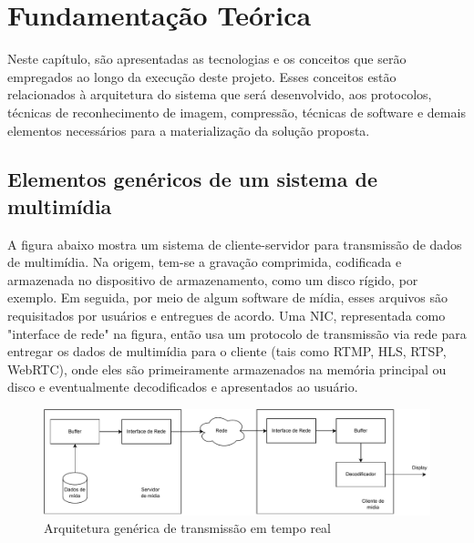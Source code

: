 \documentclass[12pt, %
openright, 
oneside, %
a4paper,    %
brazil]{facom-ufu-abntex2}
\begin{document}

\chapter{Fundamentação Teórica}

Neste capítulo, são apresentadas as tecnologias e os conceitos que serão
empregados ao longo da execução deste projeto. Esses conceitos estão
relacionados à arquitetura do sistema que será desenvolvido, aos protocolos,
técnicas de reconhecimento de imagem, compressão, técnicas de software e demais
elementos necessários para a materialização da solução proposta.

\section{Elementos genéricos de um sistema de multimídia}

A figura abaixo mostra um sistema de cliente-servidor para transmissão de dados
de multimídia. Na origem, tem-se a gravação comprimida, codificada e armazenada
no dispositivo de armazenamento, como um disco rígido, por exemplo. Em seguida,
por meio de algum software de mídia, esses arquivos são requisitados por
usuários e entregues de acordo. Uma NIC, representada como "interface de rede"
na figura, então usa um protocolo de transmissão via rede para entregar os
dados de multimídia para o cliente (tais como RTMP, HLS, RTSP, WebRTC), onde
eles são primeiramente armazenados na memória principal ou disco e
eventualmente decodificados e apresentados ao usuário.

\begin{figure}[!ht]
	\centering
	\includegraphics[width=1\linewidth]{media_fundamentals.pdf}
	\caption[Representação de um arquitetura de tempo real
		genérica]{Arquitetura genérica de transmissão em tempo real}

	\label{fig:graficosVariandoTamanhoRede}
\end{figure}
\end{document}

